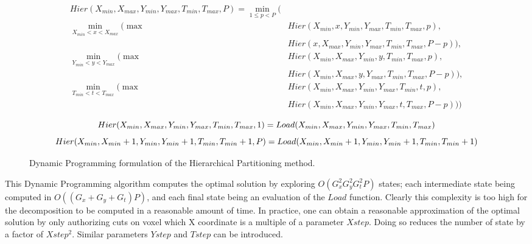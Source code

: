 \documentclass{article}
\begin{document}
\begin{figure}
  \begin{equation}
    \begin{split}
  Hier(X_{min}, X_{max}, Y_{min}, Y_{max}, T_{min}, T_{max}, P) = \min_{1 \leq p <P} (\\
\min_{X_{min}<x<X_{max}}  ( \max& Hier(X_{min}, x, Y_{min}, Y_{max}, T_{min}, T_{max}, p),\\
                         & Hier(x, X_{max}, Y_{min}, Y_{max}, T_{min}, T_{max}, P-p) ),\\
\min_{Y_{min}<y<Y_{max}}  ( \max & Hier(X_{min}, X_{max}, Y_{min}, y, T_{min}, T_{max}, p),\\
                          & Hier(X_{min}, X_{max}, y, Y_{max}, T_{min}, T_{max}, P-p) ),\\
\min_{T_{min}<t<T_{max}}  ( \max &Hier(X_{min}, X_{max}, Y_{min}, Y_{max}, T_{min}, t, p),\\
                    & Hier(X_{min}, X_{max}, Y_{min}, Y_{max}, t, T_{max}, P-p) ) )\\
    \end{split}
\end{equation}
\begin{equation}
Hier(X_{min}, X_{max}, Y_{min}, Y_{max}, T_{min}, T_{max}, 1 ) =\\
Load(X_{min}, X_{max}, Y_{min}, Y_{max}, T_{min}, T_{max})
\end{equation}
\begin{equation}
Hier(X_{min}, X_{min}+1, Y_{min}, Y_{min}+1, T_{min}, T_{min}+1, P ) =\\
Load(X_{min}, X_{min}+1, Y_{min}, Y_{min}+1, T_{min}, T_{min}+1)
\end{equation}

\caption{Dynamic Programming formulation of the Hierarchical Partitioning method.}

\label{fig:hier-dp}
\end{figure}

This Dynamic Programming algorithm computes the optimal solution by
exploring $O(G_x^2 G_y^2 G_t^2 P)$ states; each intermediate state
being computed in $O((G_x +G_y+G_t) P )$, and each final state being
an evaluation of the $Load$ function. Clearly this complexity is too
high for the decomposition to be computed in a reasonable amount of
time. In practice, one can obtain a reasonable approximation of the
optimal solution by only authorizing cuts on voxel which X coordinate
is a multiple of a parameter $Xstep$. Doing so reduces the number of
state by a factor of $Xstep^2$. Similar parameters $Ystep$ and $Tstep$
can be introduced.
\end{document}

